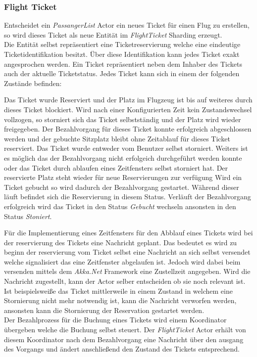 \subsubsection{Flight Ticket}
Entscheidet ein \textit{PassangerList} Actor ein neues Ticket für einen Flug zu erstellen, so wird dieses Ticket als neue Entität im \textit{FlightTicket} Sharding erzeugt. \\
Die Entität selbst repräsentiert eine Ticketreservierung welche eine eindeutige Ticketidentifikation besitzt. Über diese Identifikation kann jedes Ticket exakt angesprochen werden. Ein Ticket repräsentiert neben dem Inhaber des Tickets auch der aktuelle Ticketstatus. Jedes Ticket kann sich in einem der folgenden Zustände befinden:
\begin{enumerate}
     Das Ticket wurde Reserviert und der Platz im Flugzeug ist bis auf weiteres durch dieses Ticket blockiert. Wird nach einer Konfigurierten Zeit kein Zustandswechsel vollzogen, so storniert sich das Ticket selbstständig und der Platz wird wieder freigegeben.
     Der Bezahlvorgang für dieses Ticket konnte erfolgreich abgeschlossen werden und der gebuchte Sitzplatz bleibt ohne Zeitablauf für dieses Ticket reserviert.
     Das Ticket wurde entweder vom Benutzer selbst storniert. Weiters ist es möglich das der Bezahlvorgang nicht erfolgeich durchgeführt werden konnte oder das Ticket durch ablaufen eines Zeitfensters selbst storniert hat. Der reservierte Platz steht wieder für neue Reservierungen zur verfügung
     Wird ein Ticket gebucht so wird dadurch der Bezahlvorgang gestartet. Während dieser läuft befindet sich die Reservierung in diesem Status. Verläuft der Bezahlvorgang erfolgreich wird das Ticket in den Status \textit{Gebucht} wechseln ansonsten in den Status \textit{Stoniert}.
\end{enumerate}
Für die Implementierung eines Zeitfensters für den Abblauf eines Tickets wird bei der reservierung des Tickets eine Nachricht geplant. Das bedeutet es wird zu beginn der reservierung vom Ticket selbst eine Nachricht an sich selbst versendet welche signalisiert das eine Zeitfenster abgelaufen ist. Jedoch wird dabei beim versenden mittels dem \textit{Akka.Net} Framework eine Zustellzeit angegeben. Wird die Nachricht zugestellt, kann der Actor selber entscheiden ob sie noch relevant ist. Ist beispielsweiße das Ticket mittlerweile in einem Zustand in welchem eine Stornierung nicht mehr notwendig ist, kann die Nachricht verworfen werden, ansonsten kann die Stornierung der Reservation gestartet werden. \\
Der Bezahlprozess für die Buchung eines Tickets wird einem Koordinator übergeben welche die Buchung selbst steuert. Der \textit{FlightTicket} Actor erhält von diesem Koordinator nach dem Bezahlvorgang eine Nachricht über den ausgang des Vorgangs und ändert anschließend den Zustand des Tickets entsprechend. 

